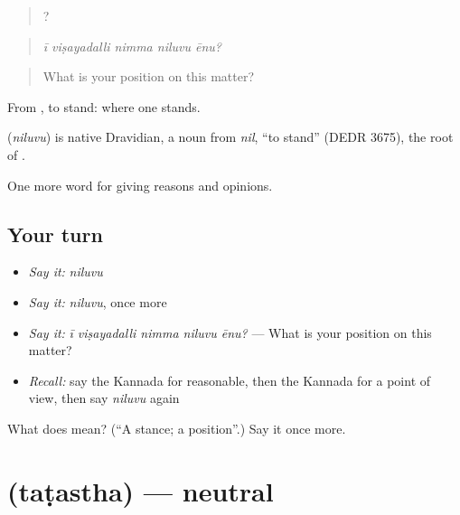 \begin{quote}
    ?
\end{quote}

\begin{quote}
\emph{ī viṣayadalli nimma niluvu ēnu?}
\end{quote}

\begin{quote}
What is your position on this matter?
\end{quote}

From , to stand: where one stands.

\begin{cousinweb}
\textbf{} (\emph{niluvu}) is native Dravidian, a noun from \emph{nil}, \textquotedblleft{}to stand\textquotedblright{} (DEDR 3675), the root of .
\end{cousinweb}

\begin{grammarlens}[title={What you've built}]
One more word for giving reasons and opinions.
\end{grammarlens}

\subsection*{Your turn}
\begin{itemize}
\raggedright
  \item \emph{Say it:} \emph{niluvu}
  \item \emph{Say it:} \emph{niluvu}, once more
  \item \emph{Say it:} \emph{ī viṣayadalli nimma niluvu ēnu?} — What is your position on this matter?
  \item \emph{Recall:} say the Kannada for reasonable, then the Kannada for a point of view, then say \emph{niluvu} again
\end{itemize}

\begin{tcolorbox}[breakable,colback=teal!4,colframe=teal!35!black,title={Before you move on}]
What does  mean? (\textquotedblleft{}A stance; a position\textquotedblright{}.) Say it once more.
\end{tcolorbox}
\section[\texorpdfstring{\kn{ತಟಸ್ಥ} (taṭastha)}{ತಟಸ್ಥ (taṭastha)}]{ (taṭastha) — neutral}

